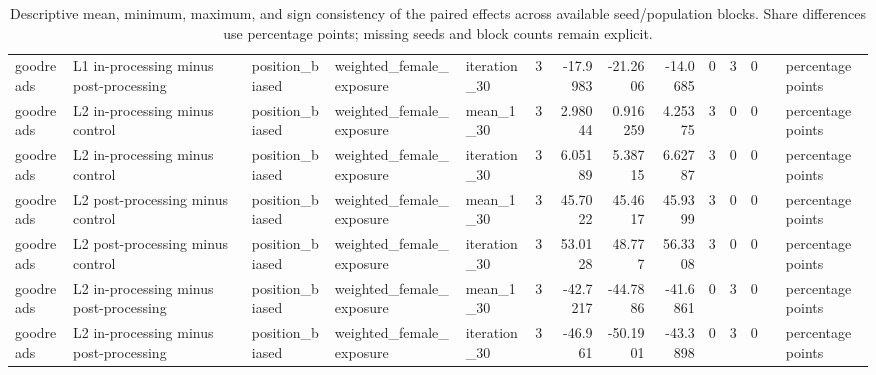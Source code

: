 \begin{table}[htbp!]
\begin{tabular}{lllllrrrrrrrll}
goodreads & L1 in-processing minus post-processing & position\_biased & weighted\_female\_exposure & iteration\_30 & 3 & -17.9983 & -21.2606 & -14.0685 & 0 & 3 & 0 &  & percentage points \\
goodreads & L2 in-processing minus control & position\_biased & weighted\_female\_exposure & mean\_1\_30 & 3 & 2.98044 & 0.916259 & 4.25375 & 3 & 0 & 0 &  & percentage points \\
goodreads & L2 in-processing minus control & position\_biased & weighted\_female\_exposure & iteration\_30 & 3 & 6.05189 & 5.38715 & 6.62787 & 3 & 0 & 0 &  & percentage points \\
goodreads & L2 post-processing minus control & position\_biased & weighted\_female\_exposure & mean\_1\_30 & 3 & 45.7022 & 45.4617 & 45.9399 & 3 & 0 & 0 &  & percentage points \\
goodreads & L2 post-processing minus control & position\_biased & weighted\_female\_exposure & iteration\_30 & 3 & 53.0128 & 48.777 & 56.3308 & 3 & 0 & 0 &  & percentage points \\
goodreads & L2 in-processing minus post-processing & position\_biased & weighted\_female\_exposure & mean\_1\_30 & 3 & -42.7217 & -44.7886 & -41.6861 & 0 & 3 & 0 &  & percentage points \\
goodreads & L2 in-processing minus post-processing & position\_biased & weighted\_female\_exposure & iteration\_30 & 3 & -46.961 & -50.1901 & -43.3898 & 0 & 3 & 0 &  & percentage points \\
\hline
\end{tabular}
\caption{Descriptive mean, minimum, maximum, and sign consistency of the paired effects across available seed/population blocks. Share differences use percentage points; missing seeds and block counts remain explicit.}
\label{chap:results:tab:rq7_seed_consistency_weighted_female_exposure}
\end{table}
